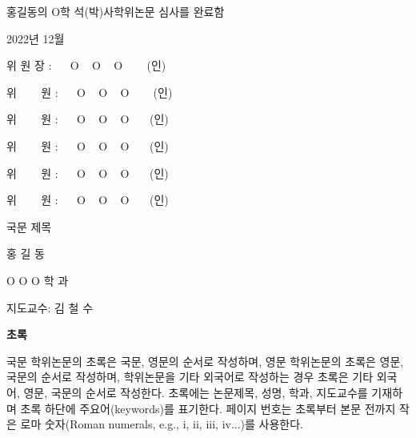 \documentclass[11pt]{report}
\newcommand\extrasize{\fontsize{16pt}{16pt}\selectfont}  %
\begin{document}
\newpage 
\vspace{1cm}
\extrasize 홍길동의 O학 석(박)사학위논문 심사를 완료함
\par\vspace{3cm} %
\Large 2022년 12월 %
\par\vspace{2cm}
\extrasize 
위 원 장 : ~~ O ~ O ~ O ~~~ (인) \par %
\vspace{1cm}
위 ~~~ 원 : ~~ O ~ O ~ O ~~~ (인) \par
\vspace{1cm}
위 ~~~ 원 : ~~ O ~ O ~ O ~~~(인) \par
\vspace{1cm}
위 ~~~ 원 : ~~ O ~ O ~ O ~~~(인) \par %
\vspace{1cm}
위 ~~~ 원 : ~~ O ~ O ~ O ~~~(인) \par %
\vspace{1cm}
위 ~~~ 원 : ~~ O ~ O ~ O ~~~(인) \par %


\newpage
{}
\begin{center}
\LARGE 국문 제목
\par\vspace{20pt}
\doublespacing
\normalsize 홍 길 동\par
O O O 학 과\par
지도교수: 김 철 수

\par\vspace{20pt}
\LARGE \textbf{초록}
\end{center}

\justifying
\doublespacing

\normalsize
국문 학위논문의 초록은 국문, 영문의 순서로 작성하며, 영문 학위논문의 초록은 영문, 국문의 순서로 작성하며, 학위논문을 기타 외국어로 작성하는 경우 초록은 기타 외국어, 영문, 국문의 순서로 작성한다.
초록에는 논문제목, 성명, 학과, 지도교수를 기재하며 초록 하단에 주요어(keywords)를 표기한다. 
페이지 번호는 초록부터 본문 전까지 작은 로마 숫자(Roman numerals, e.g., i, ii, iii, iv...)를 사용한다.
\par\vspace{1cm}
\end{document}
